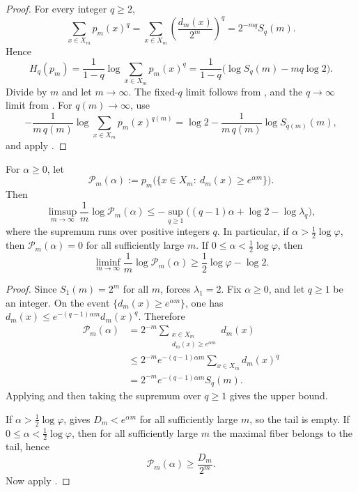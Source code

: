 \begin{proof}
For every integer \(q\ge 2\),
\[
  \sum_{x\in X_m} p_m(x)^q
  =
  \sum_{x\in X_m}\left(\frac{d_m(x)}{2^m}\right)^q
  =
  2^{-m q}S_q(m).
\]
Hence
\[
  H_q(p_m)
  =
  \frac{1}{1-q}\log\sum_{x\in X_m} p_m(x)^q
  =
  \frac{1}{1-q}\bigl(\log S_q(m)-m q\log 2\bigr).
\]
Divide by \(m\) and let \(m\to\infty\).  The fixed-\(q\) limit follows from
, and the \(q\to\infty\) limit from
.  For \(q(m)\to\infty\), use
\[
  -\frac{1}{m\,q(m)}\log \sum_{x\in X_m} p_m(x)^{q(m)}
  =
  \log 2-\frac{1}{m\,q(m)}\log S_{q(m)}(m),
\]
and apply .
\end{proof}

\begin{corollary}
\label{cor:visible-thick-tail}
For \(\alpha\ge 0\), let
\[
  \mathcal P_m(\alpha)
  :=
  p_m\bigl(\{x\in X_m:\ d_m(x)\ge e^{\alpha m}\}\bigr).
\]
Then
\[
  \limsup_{m\to\infty}\frac{1}{m}\log \mathcal P_m(\alpha)
  \le
  -\sup_{q\ge 1}\bigl((q-1)\alpha+\log 2-\log\lambda_q\bigr),
\]
where the supremum runs over positive integers \(q\).  In particular, if
\(\alpha>\frac12\log\varphi\), then \(\mathcal P_m(\alpha)=0\) for all
sufficiently large \(m\).  If \(0\le \alpha<\frac12\log\varphi\), then
\[
  \liminf_{m\to\infty}\frac{1}{m}\log \mathcal P_m(\alpha)
  \ge
  \frac12\log\varphi-\log 2.
\]
\end{corollary}

\begin{proof}
Since \(S_1(m)=2^m\) for all \(m\),  forces
\(\lambda_1=2\).  Fix \(\alpha\ge 0\), and let \(q\ge 1\) be an integer.  On the
event \(\{d_m(x)\ge e^{\alpha m}\}\), one has
\(
d_m(x)\le e^{-(q-1)\alpha m}d_m(x)^q.
\)
Therefore
\begin{align*}
  \mathcal P_m(\alpha)
  &=
  2^{-m}\sum_{\substack{x\in X_m\\ d_m(x)\ge e^{\alpha m}}} d_m(x) \\
  &\le
  2^{-m}e^{-(q-1)\alpha m}
  \sum_{x\in X_m} d_m(x)^q \\
  &=
  2^{-m}e^{-(q-1)\alpha m}S_q(m).
\end{align*}
Applying  and then taking the supremum over \(q\ge 1\)
gives the upper bound.

If \(\alpha>\frac12\log\varphi\),  gives
\(D_m<e^{\alpha m}\) for all sufficiently large \(m\), so the tail is empty.
If \(0\le \alpha<\frac12\log\varphi\), then for all sufficiently large \(m\) the
maximal fiber belongs to the tail, hence
\[
  \mathcal P_m(\alpha)\ge \frac{D_m}{2^m}.
\]
Now apply .
\end{proof}

